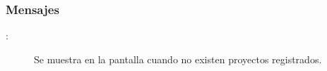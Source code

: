 \subsubsection{Mensajes}
	
\begin{description}
	\item[:] Se muestra en la pantalla  cuando no existen proyectos registrados.
\end{description}

